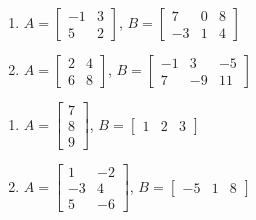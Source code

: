 \begin{multicols}{2} 
\begin{enumerate}
\setcounter{enumi}{\value{HW}}

\item  $A = \left[ \begin{array}{rr} -1 & 3 \\ 5 & 2 \end{array} \right]$, $B=\left[ \begin{array}{rrr} 7 & 0 & 8 \\ -3 & 1 & 4 \end{array} \right]$

\item  $A = \left[ \begin{array}{rr} 2 & 4 \\ 6 & 8 \end{array} \right]$, $B=\left[ \begin{array}{rrr} -1 & 3 & -5 \\ 7 & -9 & 11 \end{array} \right]$

\setcounter{HW}{\value{enumi}}
\end{enumerate}
\end{multicols}

\begin{multicols}{2} 
\begin{enumerate}
\setcounter{enumi}{\value{HW}}



\item  $A = \left[ \begin{array}{r} 7 \\ 8 \\ 9 \end{array} \right]$, $B=\left[ \begin{array}{rrr} 1 & 2 & 3 \end{array} \right]$

\item  $A = \left[ \begin{array}{rr} 1 & -2 \\ -3 & 4 \\ 5 & -6 \end{array} \right]$, $B=\left[ \begin{array}{rrr} -5 & 1 & 8 \end{array} \right]$


\setcounter{HW}{\value{enumi}}
\end{enumerate}
\end{multicols}

